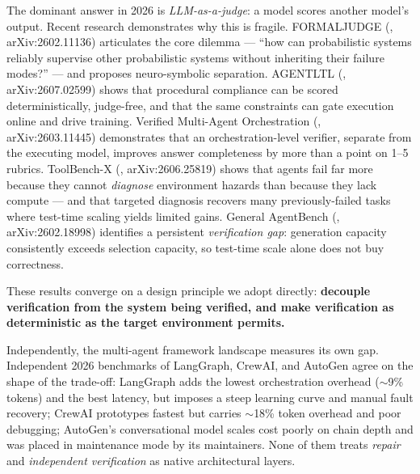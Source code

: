 \documentclass[11pt]{article}
\begin{document}
The dominant answer in 2026 is \emph{LLM-as-a-judge}: a model scores another model's
output. Recent research demonstrates why this is fragile. FORMALJUDGE
(\cite{formajudge}, arXiv:2602.11136) articulates the core dilemma --- ``how can
probabilistic systems
reliably supervise other probabilistic systems without inheriting their failure
modes?'' --- and proposes neuro-symbolic separation. AGENTLTL (\cite{agentltl},
arXiv:2607.02599) shows
that procedural compliance can be scored deterministically, judge-free, and that the same
constraints can gate execution online and drive training. Verified Multi-Agent
Orchestration (\cite{vmao}, arXiv:2603.11445) demonstrates that an orchestration-level
verifier,
separate from the executing model, improves answer completeness by more than a point on
1--5 rubrics. ToolBench-X (\cite{toolbenchx}, arXiv:2606.25819) shows that agents fail far
more because they
cannot \emph{diagnose} environment hazards than because they lack compute --- and that
targeted diagnosis recovers many previously-failed tasks where test-time scaling yields
limited gains. General AgentBench
(\cite{gentbench}, arXiv:2602.18998) identifies a persistent \emph{verification gap}:
generation capacity
consistently exceeds selection capacity, so test-time scale alone does not buy
correctness.

These results converge on a design principle we adopt directly: \textbf{decouple
verification from the system being verified, and make verification as deterministic as
the target environment permits.}

Independently, the multi-agent framework landscape measures its own gap. Independent
2026 benchmarks of LangGraph, CrewAI, and AutoGen agree on the shape of the trade-off:
LangGraph adds the lowest orchestration overhead ($\sim$9\% tokens) and the best latency,
but imposes a steep learning curve and manual fault recovery; CrewAI prototypes fastest
but carries $\sim$18\% token overhead and poor debugging; AutoGen's conversational model
scales cost poorly on chain depth and was placed in maintenance mode by its maintainers.
None of them treats \emph{repair} and \emph{independent verification} as native
architectural layers.
\end{document}
